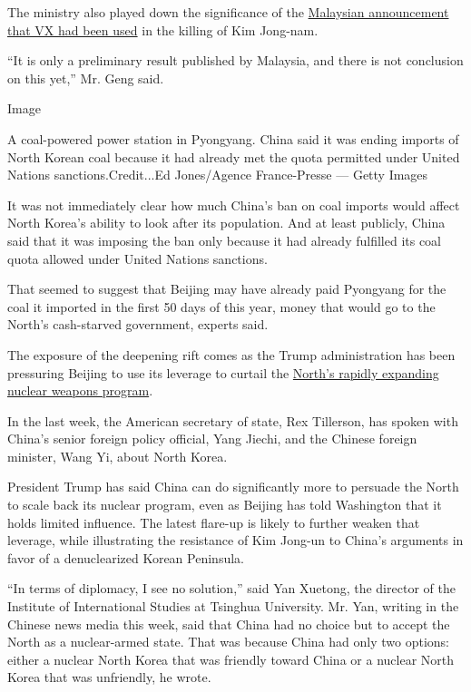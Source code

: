 The ministry also played down the significance of the
\href{https://www.nytimes3xbfgragh.onion/2017/02/23/world/asia/kim-jong-nam-vx-nerve-agent-.html}{Malaysian
announcement that VX had been used} in the killing of Kim Jong-nam.

``It is only a preliminary result published by Malaysia, and there is
not conclusion on this yet,'' Mr. Geng said.

Image

A coal-powered power station in Pyongyang. China said it was ending
imports of North Korean coal because it had already met the quota
permitted under United Nations sanctions.Credit...Ed Jones/Agence
France-Presse --- Getty Images

It was not immediately clear how much China's ban on coal imports would
affect North Korea's ability to look after its population. And at least
publicly, China said that it was imposing the ban only because it had
already fulfilled its coal quota allowed under United Nations sanctions.

That seemed to suggest that Beijing may have already paid Pyongyang for
the coal it imported in the first 50 days of this year, money that would
go to the North's cash-starved government, experts said.

The exposure of the deepening rift comes as the Trump administration has
been pressuring Beijing to use its leverage to curtail the
\href{https://www.nytimes3xbfgragh.onion/2017/02/17/world/asia/north-korea-nuclear-threat.html}{North's
rapidly expanding nuclear weapons program}.

In the last week, the American secretary of state, Rex Tillerson, has
spoken with China's senior foreign policy official, Yang Jiechi, and the
Chinese foreign minister, Wang Yi, about North Korea.

President Trump has said China can do significantly more to persuade the
North to scale back its nuclear program, even as Beijing has told
Washington that it holds limited influence. The latest flare-up is
likely to further weaken that leverage, while illustrating the
resistance of Kim Jong-un to China's arguments in favor of a
denuclearized Korean Peninsula.

``In terms of diplomacy, I see no solution,'' said Yan Xuetong, the
director of the Institute of International Studies at Tsinghua
University. Mr. Yan, writing in the Chinese news media this week, said
that China had no choice but to accept the North as a nuclear-armed
state. That was because China had only two options: either a nuclear
North Korea that was friendly toward China or a nuclear North Korea that
was unfriendly, he wrote.

